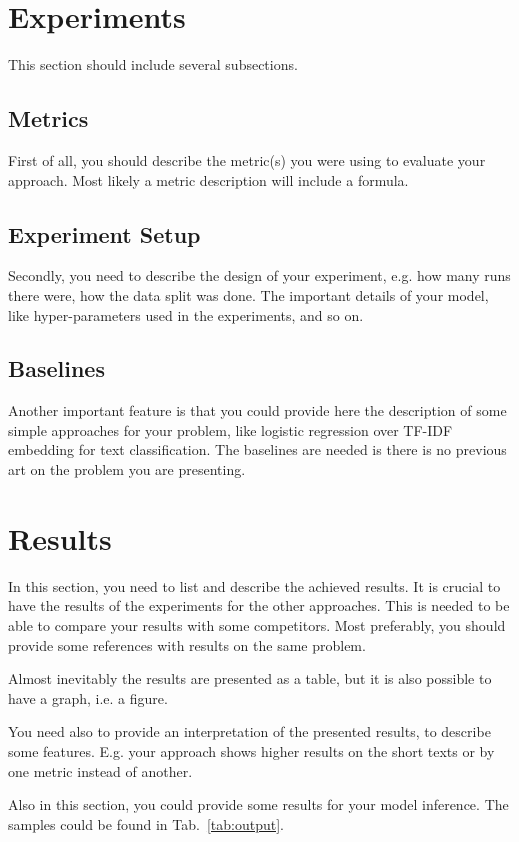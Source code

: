 \documentclass{article}
\begin{document}
\section{Experiments}
This section should include several subsections.
\subsection{Metrics}
First of all, you should describe the metric(s) you were using to evaluate your approach. Most likely a metric description will include a formula.

\subsection{Experiment Setup}
Secondly, you need to describe the design of your experiment, e.g. how many runs there were, how the data split was done. The important details of your model, like hyper-parameters used in the experiments, and so on.

\subsection{Baselines}
Another important feature is that you could provide here the description of some simple approaches for your problem, like logistic regression over TF-IDF embedding for text classification. The baselines are needed is there is no previous art on the problem you are presenting.

\section{Results}
In this section, you need to list and describe the achieved results. It is crucial to have the results of the experiments for the other approaches. This is needed to be able to compare your results with some competitors. Most preferably, you should provide some references with results on the same problem.

Almost inevitably the results are presented as a table, but it is also possible to have a graph, i.e. a figure.

You need also to provide an interpretation of the presented results, to describe some features. E.g. your approach shows higher results on the short texts or by one metric instead of another.

Also in this section, you could provide some results for your model inference. The samples could be found in Tab.~\ref{tab:output}.
\end{document}

